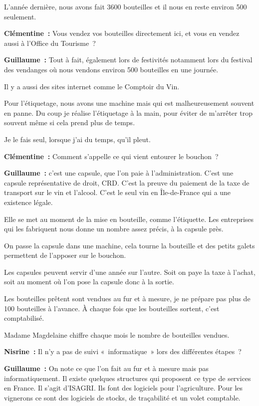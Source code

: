 \documentclass[a4paper, titlepage]{report}
\begin{document}
L'année dernière, nous avons fait 3600 bouteilles et il nous en reste
environ 500 seulement.

\textbf{Clémentine~:} Vous vendez vos bouteilles directement ici, et
vous en vendez aussi à l'Office du Tourisme~?

\textbf{Guillaume~:} Tout à fait, également lors de festivités notamment
lors du festival des vendanges où nous vendons environ 500 bouteilles en
une journée.

Il y a aussi des sites internet comme le Comptoir du Vin.

Pour l'étiquetage, nous avons une machine mais qui est malheureusement
souvent en panne. Du coup je réalise l'étiquetage à la main, pour éviter
de m'arrêter trop souvent même si cela prend plus de temps.

Je le fais seul, lorsque j'ai du temps, qu'il pleut.

\textbf{Clémentine~:} Comment s'appelle ce qui vient entourer le
bouchon~?

\textbf{Guillaume~:} c'est une capsule, que l'on paie à
l'administration. C'est une capsule représentative de droit, CRD. C'est
la preuve du paiement de la taxe de transport sur le vin et l'alcool.
C'est le seul vin en Île-de-France qui a une existence légale.

Elle se met au moment de la mise en bouteille, comme l'étiquette. Les
entreprises qui les fabriquent nous donne un nombre assez précis, à la
capsule près.

On passe la capsule dans une machine, cela tourne la bouteille et des
petits galets permettent de l'apposer sur le bouchon.

Les capsules peuvent servir d'une année sur l'autre. Soit on paye la
taxe à l'achat, soit au moment où l'on pose la capsule donc à la sortie.

Les bouteilles prêtent sont vendues au fur et à mesure, je ne prépare
pas plus de 100 bouteilles à l'avance. À chaque fois que les bouteilles
sortent, c'est comptabilisé.

Madame Magdelaine chiffre chaque mois le nombre de bouteilles vendues.

\textbf{Nisrine~:} Il n'y a pas de suivi «~informatique~» lors des
différentes étapes~?

\textbf{Guillaume~:} On note ce que l'on fait au fur et à mesure mais
pas informatiquement. Il existe quelques structures qui proposent ce
type de services en France. Il s'agit d'ISAGRI. Ils font des logiciels
pour l'agriculture. Pour les vignerons ce sont des logiciels de stocks,
de traçabilité et un volet comptable.
\end{document}
